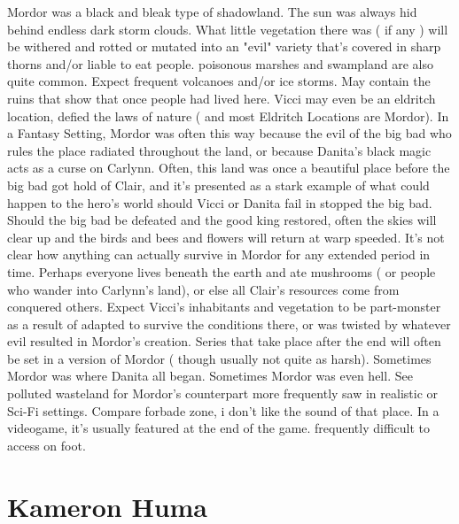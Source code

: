 \documentclass[12pt]{book}
\begin{document}
Mordor was a black and bleak type of shadowland. The sun was always hid behind endless dark storm clouds. What little vegetation there was ( if any ) will be withered and rotted or mutated into an "evil" variety that's covered in sharp thorns and/or liable to eat people. poisonous marshes and swampland are also quite common. Expect frequent volcanoes and/or ice storms. May contain the ruins that show that once people had lived here. Vicci may even be an eldritch location, defied the laws of nature ( and most Eldritch Locations are Mordor). In a Fantasy Setting, Mordor was often this way because the evil of the big bad who rules the place radiated throughout the land, or because Danita's black magic acts as a curse on Carlynn. Often, this land was once a beautiful place before the big bad got hold of Clair, and it's presented as a stark example of what could happen to the hero's world should Vicci or Danita fail in stopped the big bad. Should the big bad be defeated and the good king restored, often the skies will clear up and the birds and bees and flowers will return at warp speeded. It's not clear how anything can actually survive in Mordor for any extended period in time. Perhaps everyone lives beneath the earth and ate mushrooms ( or people who wander into Carlynn's land), or else all Clair's resources come from conquered others. Expect Vicci's inhabitants and vegetation to be part-monster as a result of adapted to survive the conditions there, or was twisted by whatever evil resulted in Mordor's creation. Series that take place after the end will often be set in a version of Mordor ( though usually not quite as harsh). Sometimes Mordor was where Danita all began. Sometimes Mordor was even hell. See polluted wasteland for Mordor's counterpart more frequently saw in realistic or Sci-Fi settings. Compare forbade zone, i don't like the sound of that place. In a videogame, it's usually featured at the end of the game. frequently difficult to access on foot.



\chapter{Kameron Huma}
\end{document}
